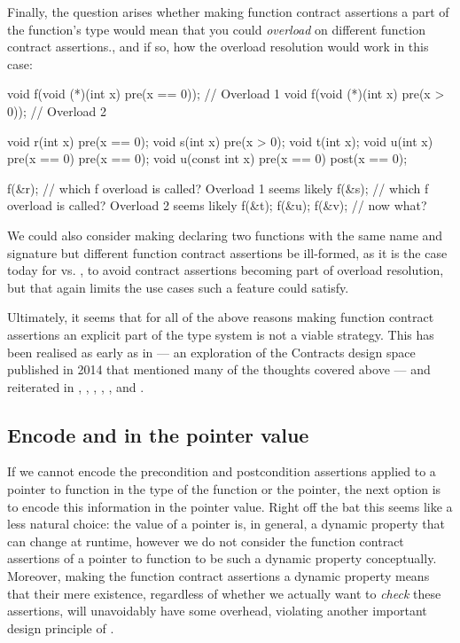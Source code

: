 Finally, the question arises whether making function contract assertions a part of the function's type would mean that you could \emph{overload} on different function contract assertions., and if so, how the overload resolution would work in this case:
\begin{codeblock}
void f(void (*)(int x) pre(x == 0));  // Overload 1
void f(void (*)(int x) pre(x > 0));   // Overload 2

void r(int x) pre(x == 0);
void s(int x) pre(x > 0);
void t(int x);
void u(int x) pre(x == 0) pre(x == 0);
void u(const int x) pre(x == 0) post(x == 0);

f(&r);  // which f overload is called? Overload 1 seems likely
f(&s);  // which f overload is called? Overload 2 seems likely
f(&t);  f(&u);  f(&v); // now what?
\end{codeblock}
We could also consider making declaring two functions with the same name and signature but different function contract assertions be ill-formed, as it is the case today for  vs. , to avoid contract assertions becoming part of overload resolution, but that again limits the use cases such a feature could satisfy.

Ultimately, it seems that for all of the above reasons making function contract assertions an explicit part of the type system is not a viable strategy. This has been realised as early as in \cite{N4110} --- an exploration of the Contracts design space published in 2014 that mentioned many of the thoughts covered above --- and reiterated in \cite{N4415}, \cite{P0246R0}, \cite{P0247R0}, \cite{P0287R0}, \cite{P0380R1}, and \cite{P0542R5}.

\subsection{Encode  and  in the pointer value}

If we cannot encode the precondition and postcondition assertions applied to a pointer to function in the type of the function or the pointer, the next option is to encode this information in the pointer value. Right off the bat this seems like a less natural choice: the value of a pointer is, in general, a dynamic property that can change at runtime, however we do not consider the function contract assertions of a pointer to function to be such a dynamic property conceptually. Moreover, making the function contract assertions a dynamic property means that their mere existence, regardless of whether we actually want to \emph{check} these assertions, will unavoidably have some overhead, violating another important design principle of \cite{P2900R7}.

